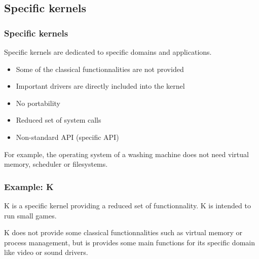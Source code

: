 %
%

\subsection{Specific kernels}

%
%

\begin{frame}
  \frametitle{Specific kernels}

  Specific kernels are dedicated to specific domains and applications.

  \begin{itemize}
  \item
    Some of the classical functionnalities are not provided
  \item
    Important drivers are directly included into the kernel
  \item
    No portability
  \item
    Reduced set of system calls
  \item
    Non-standard API (specific API)
  \end{itemize}

  \-

  For example, the operating system of a washing machine does not need
  virtual memory, scheduler or filesystems.

\end{frame}

%
%

\begin{frame}
  \frametitle{Example: K}

  K is a specific kernel providing a reduced set of functionnality. K
  is intended to run small games.

  \begin{center}
  \end{center}

  K does not provide some classical functionnalities such as virtual
  memory or process management, but is provides some main functions
  for its specific domain like video or sound drivers.

\end{frame}


